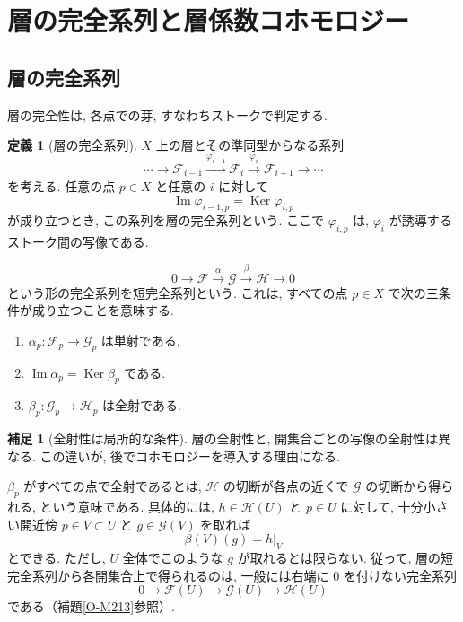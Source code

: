 \documentclass[dvipdfmx,a4paper,11pt]{article} %
\theoremstyle{definition}
\numberwithin{equation}{section}
\newtheorem{dfn}[thm]{定義}
\newtheorem{rem}[thm]{補足}
\begin{document}
\newpage

\section{層の完全系列と層係数コホモロジー}

\subsection{層の完全系列}\label{O-S037}

層の完全性は, 各点での芽, すなわちストークで判定する.

\begin{dfn}[層の完全系列]\label{O-M209}
$X$ 上の層とその準同型からなる系列
\[
\cdots\longrightarrow\mathcal F_{i-1}
\xrightarrow{\varphi_{i-1}}\mathcal F_i
\xrightarrow{\varphi_i}\mathcal F_{i+1}
\longrightarrow\cdots
\]
を考える.
任意の点 $p\in X$ と任意の $i$ に対して
\[
\operatorname{Im}\varphi_{i-1,p}
=
\operatorname{Ker}\varphi_{i,p}
\]
が成り立つとき, この系列を層の完全系列という.
ここで $\varphi_{i,p}$ は, $\varphi_i$ が誘導する
ストーク間の写像である.

\begin{equation}\label{O-EQ041}
0\longrightarrow\mathcal F
\xrightarrow{\alpha}\mathcal G
\xrightarrow{\beta}\mathcal H
\longrightarrow0
\end{equation}
という形の完全系列を短完全系列という.
これは, すべての点 $p\in X$ で次の三条件が成り立つことを意味する.
\begin{enumerate}
\item $\alpha_p:\mathcal F_p\to\mathcal G_p$ は単射である.
\item $\operatorname{Im}\alpha_p=\operatorname{Ker}\beta_p$ である.
\item $\beta_p:\mathcal G_p\to\mathcal H_p$ は全射である.
\end{enumerate}
\end{dfn}

\begin{rem}[全射性は局所的な条件]
層の全射性と, 開集合ごとの写像の全射性は異なる. この違いが, 後でコホモロジーを導入する理由になる.

$\beta_p$ がすべての点で全射であるとは, 
$\mathcal H$ の切断が各点の近くで $\mathcal G$ の切断から得られる, 
という意味である.
具体的には, $h\in\mathcal H(U)$ と $p\in U$ に対して, 
十分小さい開近傍 $p\in V\subset U$ と
$g\in\mathcal G(V)$ を取れば
\[
\beta(V)(g)=h|_V
\]
とできる.
ただし, $U$ 全体でこのような $g$ が取れるとは限らない.
従って, 層の短完全系列から各開集合上で得られるのは, 一般には右端に $0$ を付けない完全系列
\[
0\longrightarrow\mathcal F(U)
\longrightarrow\mathcal G(U)
\longrightarrow\mathcal H(U)
\]
である（補題\ref{O-M213}参照）. 
\end{rem}
\end{document}
